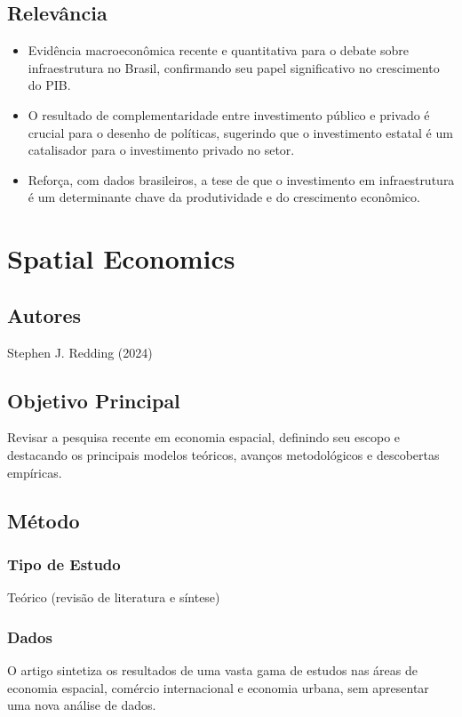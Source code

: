\documentclass[12pt]{article}
\begin{document}
\subsection*{Relevância}
\begin{itemize}
    \item Evidência macroeconômica recente e quantitativa para o debate sobre infraestrutura no Brasil, confirmando seu papel significativo no crescimento do PIB.
    \item O resultado de complementaridade entre investimento público e privado é crucial para o desenho de políticas, sugerindo que o investimento estatal é um catalisador para o investimento privado no setor.
    \item Reforça, com dados brasileiros, a tese de que o investimento em infraestrutura é um determinante chave da produtividade e do crescimento econômico.
\end{itemize}
\newpage

\section{Spatial Economics}

\subsection*{Autores}
Stephen J. Redding (2024)

\subsection*{Objetivo Principal}
Revisar a pesquisa recente em economia espacial, definindo seu escopo e destacando os principais modelos teóricos, avanços metodológicos e descobertas empíricas.

\subsection*{Método}

\subsubsection*{Tipo de Estudo}
Teórico (revisão de literatura e síntese)

\subsubsection*{Dados}
O artigo sintetiza os resultados de uma vasta gama de estudos nas áreas de economia espacial, comércio internacional e economia urbana, sem apresentar uma nova análise de dados.
\end{document}
